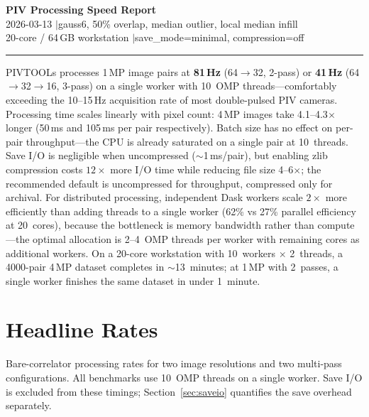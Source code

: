 \documentclass[10pt,a4paper,twocolumn]{article}
\begin{document}
\begin{center}
{\Large\bfseries PIV Processing Speed Report}\\[4pt]
{\small\color{gray} 2026-03-13 \quad$|$\quad gauss6, 50\% overlap, median outlier, local median infill}\\[1pt]
{\small\color{gray} 20-core / 64\,GB workstation \quad$|$\quad save\_mode=minimal, compression=off}
\end{center}

\vspace{-2pt}
\rule{\columnwidth}{0.4pt}

\vspace{4pt}
\noindent
PIVTOOLs processes 1\,MP image pairs at \textbf{81\,Hz} (64$\to$32, 2-pass) or \textbf{41\,Hz} (64$\to$32$\to$16, 3-pass) on a single worker with 10~OMP threads---comfortably exceeding the 10--15\,Hz acquisition rate of most double-pulsed PIV cameras. Processing time scales linearly with pixel count: 4\,MP images take 4.1--4.3$\times$ longer (50\,ms and 105\,ms per pair respectively). Batch size has no effect on per-pair throughput---the CPU is already saturated on a single pair at 10~threads. Save I/O is negligible when uncompressed (${\sim}$1\,ms/pair), but enabling zlib compression costs $12\times$ more I/O time while reducing file size 4--6$\times$; the recommended default is uncompressed for throughput, compressed only for archival. For distributed processing, independent Dask workers scale $2\times$ more efficiently than adding threads to a single worker (62\% vs 27\% parallel efficiency at 20~cores), because the bottleneck is memory bandwidth rather than compute---the optimal allocation is 2--4~OMP threads per worker with remaining cores as additional workers. On a 20-core workstation with 10~workers $\times$ 2~threads, a 4000-pair 4\,MP dataset completes in ${\sim}$13~minutes; at 1\,MP with 2~passes, a single worker finishes the same dataset in under 1~minute.

\section{Headline Rates}

Bare-correlator processing rates for two image resolutions and two multi-pass configurations. All benchmarks use 10~OMP threads on a single worker. Save I/O is excluded from these timings; Section~\ref{sec:saveio} quantifies the save overhead separately.
\end{document}
